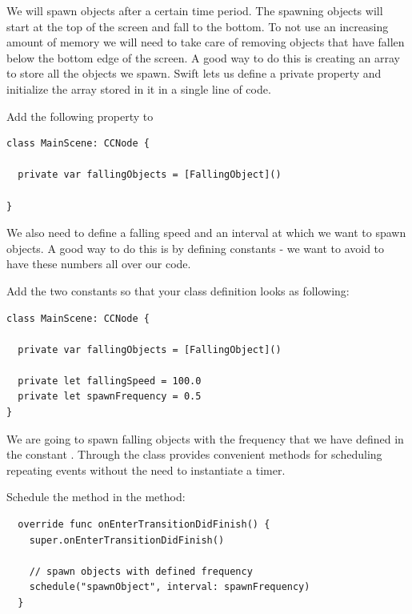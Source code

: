 We will spawn objects after a certain time period. The spawning objects will
start at the top of the screen and fall to the bottom. To not use an
increasing amount of memory we will need to take care of removing objects that
have fallen below the bottom edge of the screen. A good way to do this is
creating an array to store all the objects we spawn. Swift lets us define a
private property and initialize the array stored in it in a single line
of code.

\begin{leftbar}
Add the following property to 
\begin{lstlisting}
class MainScene: CCNode {

  private var fallingObjects = [FallingObject]()

}
\end{lstlisting}
\end{leftbar}

We also need to define a falling speed and an interval at which we want to spawn
objects. A good way to do this is by defining constants - we want to avoid to
have these numbers all over our code. 

\begin{leftbar}
Add the two constants so that your class definition looks as following:

\begin{lstlisting}
class MainScene: CCNode {

  private var fallingObjects = [FallingObject]()

  private let fallingSpeed = 100.0
  private let spawnFrequency = 0.5
}
\end{lstlisting}
\end{leftbar}

We are going to spawn falling objects with the frequency that we have defined in
the constant . Through the  class
\cocos{} provides convenient methods for scheduling repeating events without the
need to instantiate a timer. 

\begin{leftbar}
Schedule the  method in the
 method:

\begin{lstlisting}
  override func onEnterTransitionDidFinish() {
    super.onEnterTransitionDidFinish()
    
    // spawn objects with defined frequency
    schedule("spawnObject", interval: spawnFrequency)
  }
\end{lstlisting}
\end{leftbar}

